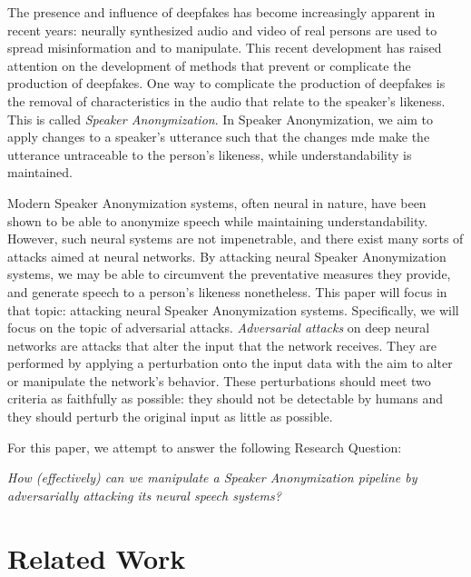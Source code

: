\documentclass[11pt]{article}
\begin{document}
The presence and influence of deepfakes has become increasingly apparent in recent years: neurally synthesized audio and video of real persons are used to spread misinformation and to manipulate.
This recent development has raised attention on the development of methods that prevent or complicate the production of deepfakes.
One way to complicate the production of deepfakes is the removal of characteristics in the audio that relate to the speaker's likeness.
This is called \textit{Speaker Anonymization}.
In Speaker Anonymization, we aim to apply changes to a speaker's utterance such that the changes mde make the utterance untraceable to the person's likeness, while understandability is maintained.

Modern Speaker Anonymization systems, often neural in nature, have been shown to be able to anonymize speech while maintaining understandability.
However, such neural systems are not impenetrable, and there exist many sorts of attacks aimed at neural networks.
By attacking neural Speaker Anonymization systems, we may be able to circumvent the preventative measures they provide, and generate speech to a person's likeness nonetheless.
This paper will focus in that topic: attacking neural Speaker Anonymization systems.
Specifically, we will focus on the topic of adversarial attacks.
\textit{Adversarial attacks} on deep neural networks are attacks that alter the input that the network receives.
They are performed by applying a perturbation onto the input data with the aim to alter or manipulate the network's behavior.
These perturbations should meet two criteria as faithfully as possible: they should not be detectable by humans and they should perturb the original input as little as possible.

For this paper, we attempt to answer the following Research Question:
\begin{displayquote}
  \textit{How (effectively) can we manipulate a Speaker Anonymization pipeline by adversarially attacking its neural speech systems?}
\end{displayquote}

\section{Related Work}
\end{document}
